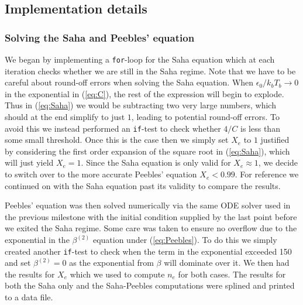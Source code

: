\documentclass[%
reprint,
 amsmath,amssymb,
 aps,
]{revtex4-2}
\begin{document}
\subsection{Implementation details}
\subsubsection{Solving the Saha and Peebles' equation}
We began by implementing a \texttt{for}-loop for the Saha equation which at each iteration checks whether we are still in the Saha regime. Note that we have to be careful about round-off errors when solving the Saha equation. When $\epsilon_0/k_bT_b\to0$ in the exponential in (\ref{eq:C}), the rest of the expression will begin to explode. Thus in (\ref{eq:Saha}) we would be subtracting two very large numbers, which should at the end simplify to just $1$, leading to potential round-off errors. To avoid this we instead performed an \texttt{if}-test to check whether $4/C$ is less than some small threshold. Once this is the case then we simply set $X_e$ to $1$ justified by considering the first order expansion of the square root in (\ref{eq:Saha}), which will just yield $X_e=1$. Since the Saha equation is only valid for $X_e\approx1$, we decide to switch over to the more accurate Peebles' equation $X_e<0.99$. For reference we continued on with the Saha equation past its validity to compare the results. 

Peebles' equation was then solved numerically via the same ODE solver used in the previous milestone with the initial condition supplied by the last point before we exited the Saha regime. Some care was taken to ensure no overflow due to the exponential in the $\beta^{(2)}$ equation under (\ref{eq:Peebles}). To do this we simply created another \texttt{if}-test to check when the term in the exponential exceeded 150 and set $\beta^{(2)}=0$ as the exponential from $\beta$ will dominate over it. We then had the results for $X_e$ which we used to compute $n_e$ for both cases. The results for both the Saha only and the Saha-Peebles computations were splined and printed to a data file.
\end{document}
